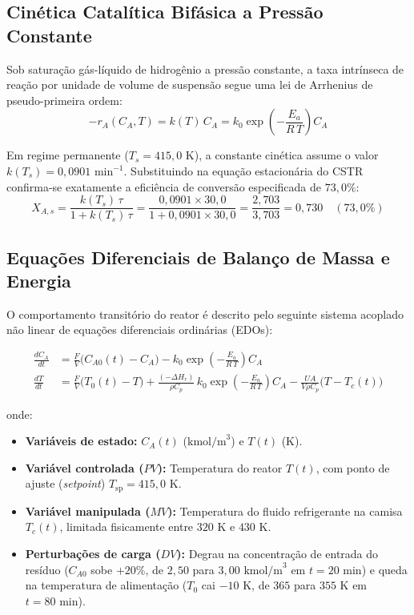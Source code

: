 \documentclass[11pt, a4paper]{article}
\begin{document}
\subsection{Cinética Catalítica Bifásica a Pressão Constante}
Sob saturação gás-líquido de hidrogênio a pressão constante, a taxa intrínseca de reação por unidade de volume de suspensão segue uma lei de Arrhenius de pseudo-primeira ordem:
\begin{equation}
  -r_A(C_A, T) = k(T)\, C_A = k_0 \exp\!\left(-\frac{E_a}{R\,T}\right) C_A
\end{equation}

Em regime permanente ($T_s = 415{,}0\text{ K}$), a constante cinética assume o valor $k(T_s) = 0{,}0901\text{ min}^{-1}$. Substituindo na equação estacionária do CSTR confirma-se exatamente a eficiência de conversão especificada de $73{,}0\%$:
\begin{equation}
  X_{A,s} = \frac{k(T_s)\,\tau}{1 + k(T_s)\,\tau} = \frac{0{,}0901 \times 30{,}0}{1 + 0{,}0901 \times 30{,}0} = \frac{2{,}703}{3{,}703} = 0{,}730 \quad (73{,}0\%)
\end{equation}

\subsection{Equações Diferenciais de Balanço de Massa e Energia}
O comportamento transitório do reator é descrito pelo seguinte sistema acoplado não linear de equações diferenciais ordinárias (EDOs):

\begin{align}
  \frac{dC_A}{dt} &= \frac{F}{V}\big(C_{A0}(t) - C_A\big) - k_0 \exp\!\left(-\frac{E_a}{R\,T}\right) C_A \\[6pt]
  \frac{dT}{dt} &= \frac{F}{V}\big(T_0(t) - T\big) + \frac{(-\Delta H_r)}{\rho C_p}\, k_0 \exp\!\left(-\frac{E_a}{R\,T}\right) C_A - \frac{UA}{V \rho C_p}\big(T - T_c(t)\big)
\end{align}

\noindent onde:
\begin{itemize}
  \item \textbf{Variáveis de estado:} $C_A(t)$ ($\text{kmol/m}^3$) e $T(t)$ ($\text{K}$).
  \item \textbf{Variável controlada ($PV$):} Temperatura do reator $T(t)$, com ponto de ajuste (\textit{setpoint}) $T_{\text{sp}} = 415{,}0\text{ K}$.
  \item \textbf{Variável manipulada ($MV$):} Temperatura do fluido refrigerante na camisa $T_c(t)$, limitada fisicamente entre $320\text{ K}$ e $430\text{ K}$.
  \item \textbf{Perturbações de carga ($DV$):} Degrau na concentração de entrada do resíduo ($C_{A0}$ sobe $+20\%$, de $2{,}50$ para $3{,}00\text{ kmol/m}^3$ em $t = 20\text{ min}$) e queda na temperatura de alimentação ($T_0$ cai $-10\text{ K}$, de $365$ para $355\text{ K}$ em $t = 80\text{ min}$).
\end{itemize}
\end{document}
